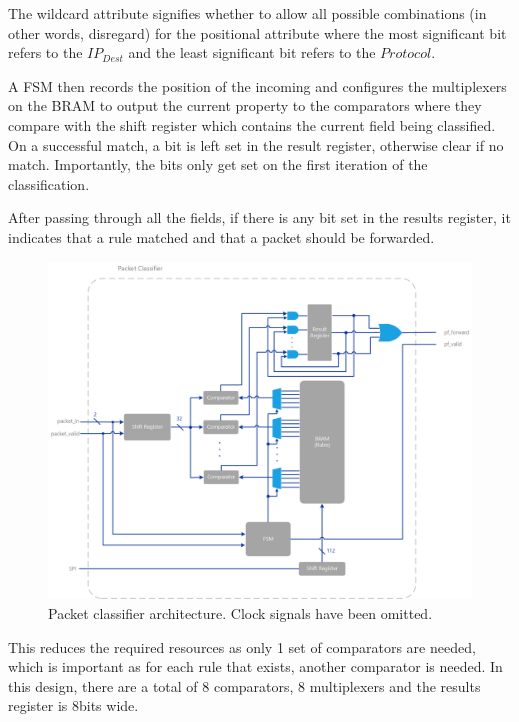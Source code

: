 The wildcard attribute signifies whether to allow all possible combinations (in other words, disregard) for the positional attribute where the most significant bit refers to the $IP_{Dest}$ and the least significant bit refers to the $Protocol$.

A FSM then records the position of the incoming and configures the multiplexers on the BRAM to output the current property to the comparators where they compare with the shift register which contains the current field being classified. On a successful match, a bit is left set in the result register, otherwise clear if no match. Importantly, the bits only get set on the first iteration of the classification. 

After passing through all the fields, if there is any bit set in the results register, it indicates that a rule matched and that a packet should be forwarded. 


\begin{figure}[h!]
    \centering
    \includegraphics[width=1\textwidth]{Images/PacketFilterArchitecture.png}
    \caption[Packet classifier architecture]{Packet classifier architecture. Clock signals have been omitted.}
    \label{fig:packet_classifier_architecture}
\end{figure}

This reduces the required resources as only 1 set of comparators are needed, which is important as for each rule that exists, another comparator is needed. In this design, there are a total of 8 comparators, 8 multiplexers and the results register is 8bits wide. 

